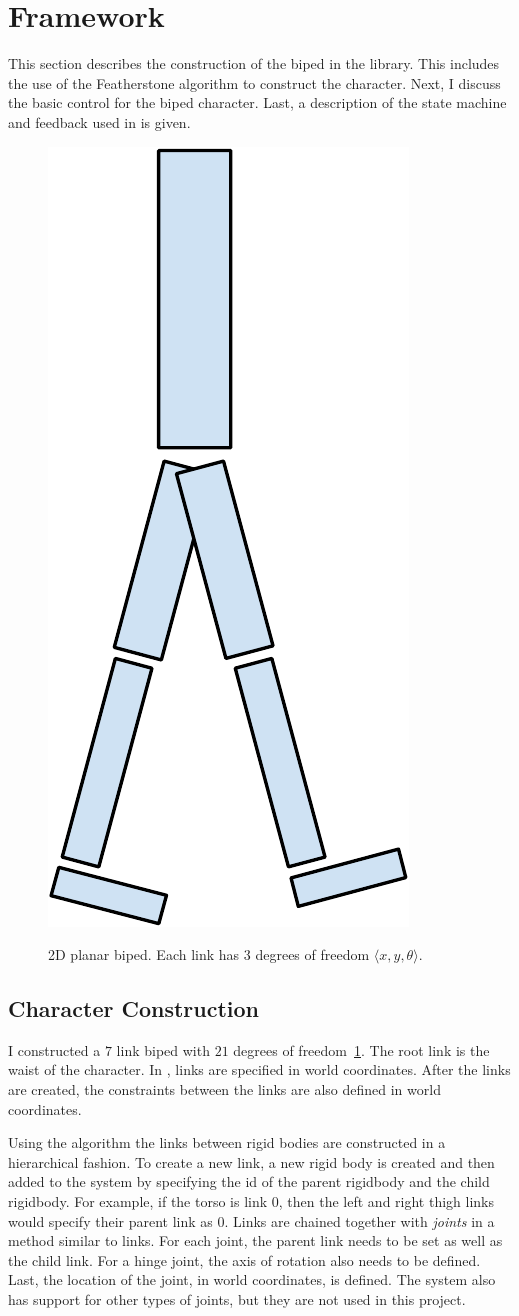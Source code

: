 
\section{Framework}
\label{sec:framework}

This section describes the construction of the biped in the \bulletPhysics library. This includes the use of the Featherstone algorithm to construct the character. Next, I discuss the basic control for the biped character. Last, a description of the state machine and feedback used in \SIMBICON is given. 

\begin{figure}[H]
\centering
	\includegraphics[width=0.2\linewidth]{../images/2D-Biped-crop.pdf} \\
	\caption{\label{figure:2d-biped} 2D planar biped. Each link has $3$ degrees of freedom $\langle x, y, \theta \rangle$.}
\end{figure}

\subsection{Character Construction}

I constructed a $7$ link biped with $21$ degrees of freedom~\ref{figure:2d-biped}. 
The root link is the waist of the character.
In \bulletPhysics, links are specified in world coordinates.
After the links are created, the constraints between the links are also defined in world coordinates.
 
Using the \Featherstone algorithm the links between rigid bodies are constructed in a hierarchical fashion. 
To create a new link, a new rigid body is created and then added to the system by specifying the id of the parent rigidbody and the child rigidbody. 
For example, if the torso is link $0$, then the left and right thigh links would specify their parent link as $0$.
Links are chained together with \emph{joints} in a method similar to links.
For each joint, the parent link needs to be set as well as the child link.
For a hinge joint, the axis of rotation also needs to be defined.
Last, the location of the joint, in world coordinates, is defined.
The system also has support for other types of joints, but they are not used in this project.

